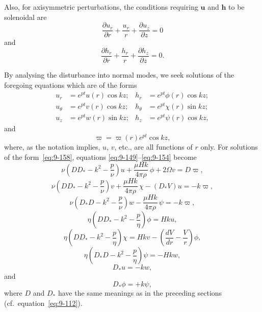 Also, for axisymmetric perturbations, the conditions requiring $\mathbf{u}$ and $\mathbf{h}$ to be solenoidal are
\begin{equation}
\frac{\partial u_r}{\partial r} + \frac{u_r}{r} + \frac{\partial u_z}{\partial z} = 0 \label{eq:9-156}
\end{equation}
and
\begin{equation}
\frac{\partial h_r}{\partial r} + \frac{h_r}{r} + \frac{\partial h_z}{\partial z} = 0. \label{eq:9-157}
\end{equation}

By analysing the disturbance into normal modes, we seek solutions of the foregoing equations which are of the forms
\begin{equation}
\begin{aligned}
u_r &= e^{pt}u(r)\cos kz; & h_r &= e^{pt}\phi(r)\cos kz; \\
u_\theta &= e^{pt}v(r)\cos kz; & h_\theta &= e^{pt}\chi(r)\sin kz; \\
u_z &= e^{pt}w(r)\sin kz; & h_z &= e^{pt}\psi(r)\cos kz,
\end{aligned} \label{eq:9-158}
\end{equation}
and
\[
\varpi = \varpi(r) e^{pt}\cos kz,
\]
where, as the notation implies, $u$, $v$, etc., are all functions of $r$ only. For solutions of the form~\eqref{eq:9-158}, equations \eqref{eq:9-149}--\eqref{eq:9-154} become
\begin{equation}
\nu\left(DD_* - k^2 - \frac{p}{\nu}\right) u + \frac{\mu Hk}{4\pi\rho}\, \phi + 2\Omega v = D\varpi, \label{eq:9-159}
\end{equation}
\begin{equation}
\nu\left(DD_* - k^2 - \frac{p}{\nu}\right) v + \frac{\mu Hk}{4\pi\rho}\, \chi - (D_*V) u = -k\varpi, \label{eq:9-160}
\end{equation}
\begin{equation}
\nu\left(D_*D - k^2 - \frac{p}{\nu}\right) w - \frac{\mu Hk}{4\pi\rho}\, \psi = -k\varpi, \label{eq:9-161}
\end{equation}
\begin{equation}
\eta\left(DD_* - k^2 - \frac{p}{\eta}\right) \phi = Hku, \label{eq:9-162}
\end{equation}
\begin{equation}
\eta\left(DD_* - k^2 - \frac{p}{\eta}\right) \chi = Hkv - \left(\frac{dV}{dr} - \frac{V}{r}\right)\phi, \label{eq:9-163}
\end{equation}
\begin{equation}
\eta\left(D_*D - k^2 - \frac{p}{\eta}\right) \psi = -Hkw, \label{eq:9-164}
\end{equation}
\begin{equation}
D_* u = -kw, \label{eq:9-165}
\end{equation}
and
\begin{equation}
D_* \phi = +k\psi, \label{eq:9-166}
\end{equation}
where $D$ and $D_*$ have the same meanings as in the preceding sections (cf.\ equation~\eqref{eq:9-112}).

